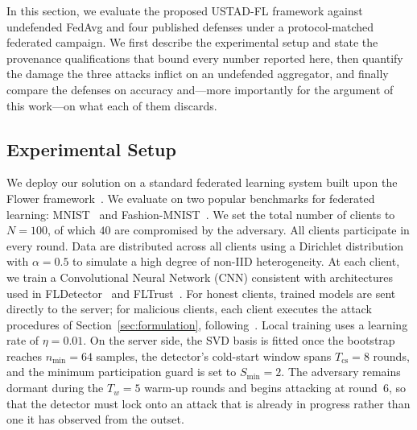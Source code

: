 \documentclass[journal]{IEEEtran}
\begin{document}
In this section, we evaluate the proposed USTAD-FL framework against undefended FedAvg and
four published defenses under a protocol-matched federated campaign. We first describe the
experimental setup and state the provenance qualifications that bound every number reported
here, then quantify the damage the three attacks inflict on an undefended aggregator, and
finally compare the defenses on accuracy and---more importantly for the argument of this
work---on what each of them discards.

\subsection{Experimental Setup}
\label{sec:experimental_setup}

We deploy our solution on a standard federated learning system built upon the Flower framework~\cite{beutel2020flower}. We evaluate on two popular benchmarks for federated learning: MNIST~\cite{lecun1998mnist} and Fashion-MNIST~\cite{xiao2017fashion}. We set the total number of clients to $N = 100$, of which $40$ are compromised by the adversary. All clients participate in every round. Data are distributed across all clients using a Dirichlet distribution with $\alpha = 0.5$ to simulate a high degree of non-IID heterogeneity. At each client, we train a Convolutional Neural Network (CNN) consistent with architectures used in FLDetector~\cite{zhang2022fldetector} and FLTrust~\cite{cao2020fltrust}. For honest clients, trained models are sent directly to the server; for malicious clients, each client executes the attack procedures of Section~\ref{sec:formulation}, following~\cite{baruch2019little, shejwalkar2021manipulating}. Local training uses a learning rate of $\eta = 0.01$. On the server side, the SVD basis is fitted once the bootstrap reaches $n_{\min} = 64$ samples, the detector's cold-start window spans $T_{\mathrm{cs}} = 8$ rounds, and the minimum participation guard is set to $S_{\min} = 2$. The adversary remains dormant during the $T_w = 5$ warm-up rounds and begins attacking at round~$6$, so that the detector must lock onto an attack that is already in progress rather than one it has observed from the outset.
\end{document}
